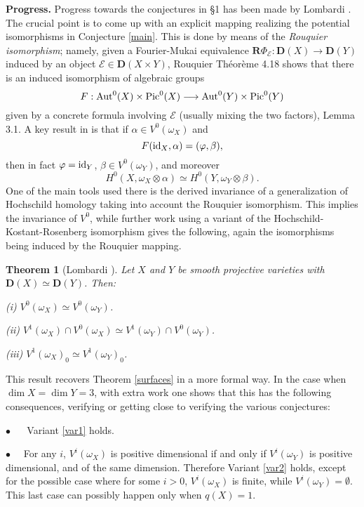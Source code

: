 \documentclass{amsart}
\theoremstyle{plain}
\newtheorem{theorem}{Theorem}[section]
\theoremstyle{definition}
\numberwithin{equation}{section}
\begin{document}
\noindent
{\bf Progress.}
Progress towards the conjectures in \S1 has been made by Lombardi \cite{lombardi}.
The crucial point is to come up with an explicit mapping realizing the potential isomorphisms in 
Conjecture \ref{main}. This is done by means of the \emph{Rouquier isomorphism}; namely, 
given a Fourier-Mukai equivalence ${\mathbf{R}}\Phi_{\mathcal{E}} : {\mathbf{D}}(X) \rightarrow {\mathbf{D}}(Y)$ induced by an object
${\mathcal{E}} \in  {\mathbf{D}}(X\times Y)$, Rouquier \cite{rouquier} Th\'eor\`eme 4.18 shows that there is an induced isomorphism of algebraic groups
$$F : {\rm Aut}^0 (X) \times {\rm Pic}^0 (X) \longrightarrow {\rm Aut}^0 (Y) \times {\rm Pic}^0 (Y)$$
given by a concrete formula involving ${\mathcal{E}}$ (usually mixing the two factors), \cite{PS} Lemma 3.1. 
A key result in
\cite{lombardi} is that if $\alpha \in V^0 (\omega_X)$ and 
$$F({\rm id}_X, \alpha) = ( \varphi, \beta),$$
then in fact $\varphi = {\rm id}_Y$, $\beta \in V^0 (\omega_Y)$, and moreover 
\begin{equation}\label{precise}
H^0 (X, \omega_X\otimes \alpha) \simeq H^0 (Y, \omega_Y \otimes \beta).
\end{equation}
One of the main tools used there 
is the derived invariance of a generalization of Hochschild homology taking into account the 
Rouquier isomorphism. This implies the  invariance of $V^0$, while further work using a variant of
the Hochschild-Kostant-Rosenberg isomorphism gives the following, again the isomorphisms being 
induced by the Rouquier mapping.

\begin{theorem}[Lombardi \cite{lombardi}]\label{luigi}
Let $X$ and $Y$ be smooth projective varieties with ${\mathbf{D}}(X) \simeq {\mathbf{D}}(Y)$. Then:

\noindent
(i) $V^0 (\omega_X) \simeq V^0 (\omega_Y)$. 

\noindent
(ii) $V^1 (\omega_X) \cap V^0 (\omega_X) \simeq V^1 (\omega_Y) \cap V^0 (\omega_Y)$. 

\noindent
(iii) $V^1 (\omega_X)_0 \simeq V^1 (\omega_Y)_0$. 
\end{theorem}

This result recovers Theorem \ref{surfaces} in a more formal way.
In the case when $\dim X = \dim Y = 3$, with extra work one shows that this has the following consequences, 
verifying or getting close to verifying the various conjectures:

\noindent
$\bullet$~ \,\,~Variant \ref{var1} holds.

\noindent
$\bullet$~\,\,~For any $i$, $V^i (\omega_X)$ is positive dimensional if and only if $V^i (\omega_Y)$ is positive 
dimensional, and of the same dimension. Therefore Variant \ref{var2} holds, except for the possible case where for 
some $i >0$, $V^i (\omega_X)$ is finite, while $V^i (\omega_Y) = \emptyset$. This last case can possibly happen 
only when $q (X) = 1$.
\end{document}
